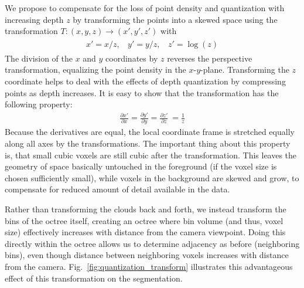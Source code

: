 We propose to compensate for the loss of point density and quantization with increasing depth $z$ by transforming the points into a skewed space using the transformation $T:(x,y,z)\rightarrow(x',y',z')$ with
      \begin{align}
    \begin{aligned}
    x'= x/z,~~~~y'= y/z,~~~~z' = \log(z)
    \end{aligned}
      \end{align}
The division of the $x$ and $y$ coordinates by $z$ reverses the perspective transformation, equalizing the point density in the $x$-$y$-plane. Transforming the $z$ coordinate helps to deal with the effects of depth quantization by compressing points as depth increases. It is easy to show that the transformation has the following property:
\begin{align}
  \frac{\partial x'}{\partial x} = \frac{\partial y'}{\partial y} = \frac{\partial z'}{\partial z}~=\frac{1}{z}
\end{align}
Because the derivatives are equal, the local coordinate frame is stretched equally along all axes by the transformations. The important thing about this property is, that small cubic voxels are still cubic after the transformation. This leaves the geometry of space basically untouched in the foreground (if the voxel size is chosen sufficiently small), while voxels in the background are skewed and grow, to compensate for reduced amount of detail available in the data.

Rather than transforming the clouds back and forth, we instead transform the bins of the octree itself, creating an octree where bin volume (and thus, voxel size) effectively increases with distance from the camera viewpoint. Doing this directly within the octree allows us to determine adjacency as before (neighboring bins), even though distance between neighboring voxels increases with distance from the camera. Fig.~\ref{fig:quantization_transform} illustrates this advantageous effect of this transformation on the segmentation.

